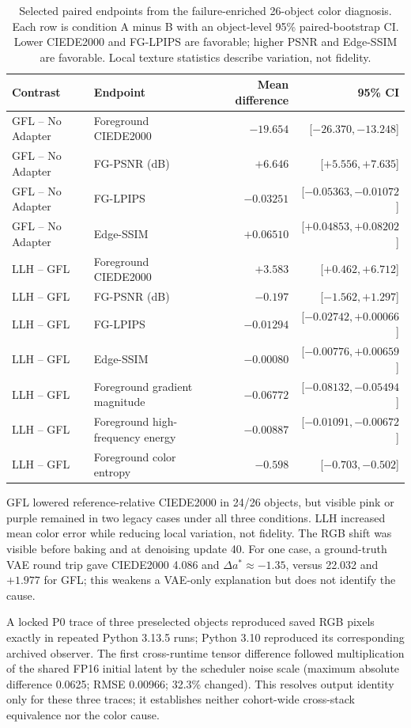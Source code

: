 \documentclass[11pt]{article}
\begin{document}
\begin{table}[ht]
\centering\scriptsize
\caption{Selected paired endpoints from the failure-enriched 26-object color diagnosis. Each row is condition A minus B with an object-level 95\% paired-bootstrap CI. Lower CIEDE2000 and FG-LPIPS are favorable; higher PSNR and Edge-SSIM are favorable. Local texture statistics describe variation, not fidelity.}
\label{tab:color-diagnostic}
\begin{tabular}{llrr}
\toprule Contrast & Endpoint & Mean difference & 95\% CI \\
\midrule
GFL -- No Adapter & Foreground CIEDE2000 & $-19.654$ & [$-26.370,-13.248$] \\
GFL -- No Adapter & FG-PSNR (dB) & $+6.646$ & [$+5.556,+7.635$] \\
GFL -- No Adapter & FG-LPIPS & $-0.03251$ & [$-0.05363,-0.01072$] \\
GFL -- No Adapter & Edge-SSIM & $+0.06510$ & [$+0.04853,+0.08202$] \\
LLH -- GFL & Foreground CIEDE2000 & $+3.583$ & [$+0.462,+6.712$] \\
LLH -- GFL & FG-PSNR (dB) & $-0.197$ & [$-1.562,+1.297$] \\
LLH -- GFL & FG-LPIPS & $-0.01294$ & [$-0.02742,+0.00066$] \\
LLH -- GFL & Edge-SSIM & $-0.00080$ & [$-0.00776,+0.00659$] \\
LLH -- GFL & Foreground gradient magnitude & $-0.06772$ & [$-0.08132,-0.05494$] \\
LLH -- GFL & Foreground high-frequency energy & $-0.00887$ & [$-0.01091,-0.00672$] \\
LLH -- GFL & Foreground color entropy & $-0.598$ & [$-0.703,-0.502$] \\
\bottomrule
\end{tabular}
\end{table}

GFL lowered reference-relative CIEDE2000 in 24/26 objects, but visible pink or purple remained in two legacy cases under all three conditions. LLH increased mean color error while reducing local variation, not fidelity. The RGB shift was visible before baking and at denoising update 40. For one case, a ground-truth VAE round trip gave CIEDE2000 4.086 and $\Delta a^*\approx-1.35$, versus 22.032 and $+1.977$ for GFL; this weakens a VAE-only explanation but does not identify the cause.

A locked P0 trace of three preselected objects reproduced saved RGB pixels exactly in repeated Python 3.13.5 runs; Python 3.10 reproduced its corresponding archived observer. The first cross-runtime tensor difference followed multiplication of the shared FP16 initial latent by the scheduler noise scale (maximum absolute difference 0.0625; RMSE 0.00966; 32.3\% changed). This resolves output identity only for these three traces; it establishes neither cohort-wide cross-stack equivalence nor the color cause.
\end{document}

